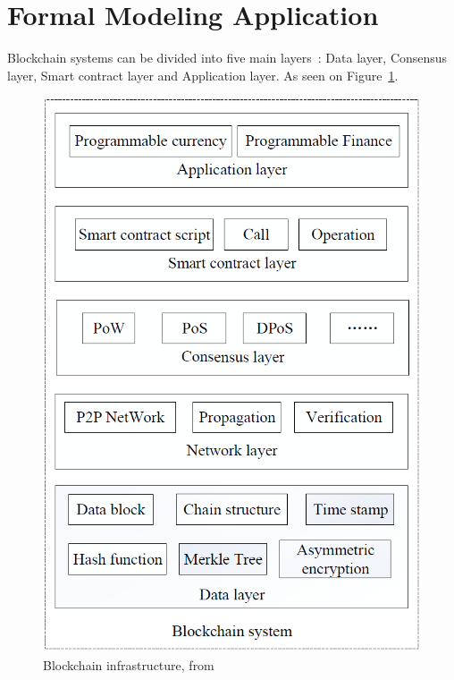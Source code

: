 \documentclass[sigconf, nonacm]{acmart}
\begin{document}
\section{Formal Modeling Application}\label{formalModeling}
Blockchain systems can be divided into five main layers~\cite{Duan2018}: Data layer, Consensus layer, Smart contract layer and Application layer. 
As seen on Figure~\ref{fig:blockchain-layers}.

  \begin{figure}[h]
    \centering
    \includegraphics[width=\linewidth]{blockchain-layers}
    \caption{Blockchain infrastructure, from \cite{Duan2018}}
    \label{fig:blockchain-layers}
  \end{figure}
\end{document}
